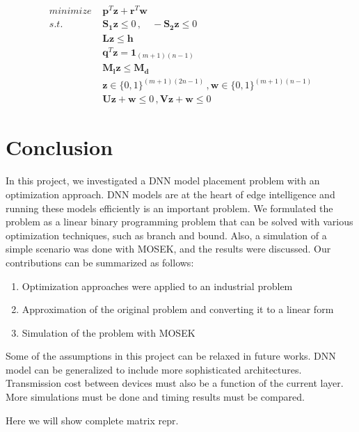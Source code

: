 \documentclass[lettersize,journal]{IEEEtran}
\begin{document}
\begin{align}
\label{matrix_form}
minimize \, \, & \boldsymbol{p}^T \boldsymbol{z} + \boldsymbol{r}^T \boldsymbol{w} \\
s.t.  \, \, & \boldsymbol{S_1} \boldsymbol{z} \leq 0 \, , \quad -\boldsymbol{S_2} \boldsymbol{z} \leq 0 \nonumber \\
\quad & \boldsymbol{L}\boldsymbol{z} \leq \boldsymbol{h} \nonumber \\
\quad &  \boldsymbol{q}^T \boldsymbol{z} = \boldsymbol{1}_{(m+1)(n-1)}  \nonumber \\
\quad &  \boldsymbol{M_l} \boldsymbol{z} \leq \boldsymbol{M_d} \nonumber \\
\quad &  \boldsymbol{z} \in \{0, 1\}^{(m+1)(2n-1)} \, , \boldsymbol{w} \in \{0, 1\}^{(m+1)(n-1)} \nonumber \\
\quad &  \boldsymbol{U} \boldsymbol{z} + \boldsymbol{w} \leq 0 \, , \boldsymbol{V} \boldsymbol{z} + \boldsymbol{w} \leq 0 \nonumber
\end{align}

\section{Conclusion}
In this project, we investigated a DNN model placement problem with an optimization approach. DNN models are at the heart of edge intelligence and running these models efficiently is an important problem. We formulated the problem as a linear binary programming problem that can be solved with various optimization techniques, such as branch and bound. Also, a simulation of a simple scenario was done with MOSEK, and the results were discussed. Our contributions can be summarized as follows:
\begin{enumerate}
\item{Optimization approaches were applied to an industrial problem}
\item{Approximation of the original problem and converting it to a linear form}
\item{Simulation of the problem with MOSEK}
\end{enumerate}
Some of the assumptions in this project can be relaxed in future works. DNN model can be generalized to include more sophisticated architectures. Transmission cost between devices must also be a function of the current layer. More simulations must be done and timing results must be compared.

{
Here we will show complete matrix repr.
}



\end{document}
